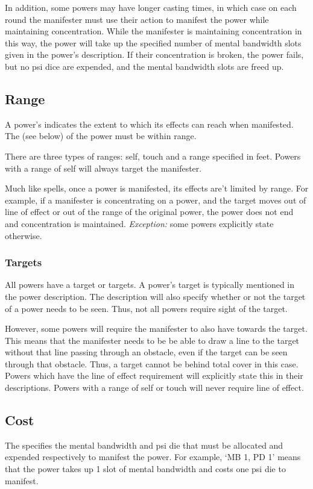 In addition, some powers may have longer casting times,
in which case on each round the manifester must use their action
to manifest the power while maintaining concentration.
While the manifester is maintaining concentration in this way,
the power will take up the specified number
of mental bandwidth slots given in the power's description.
If their concentration is broken, the power fails,
but no psi dice are expended,
and the mental bandwidth slots are freed up.

\subsection{Range}
A power's  indicates the extent
to which its effects can reach when manifested.
The  (see below) of the power must be within range.

There are three types of ranges: self, touch and a range
specified in feet.
Powers with a range of self will always target the manifester.

Much like spells,
once a power is manifested,
its effects are't limited by range.
For example,
if a manifester is concentrating on a power,
and the target moves out of line of effect or out of
the range of the original power,
the power does not end and concentration is maintained.
\textit{Exception:} some powers explicitly state otherwise.

\subsubsection{Targets}
All powers have a target or targets.
A power's target is typically mentioned in the power description.
The description will also specify whether or not the target
of a power needs to be seen.
Thus, not all powers require sight of the target.

However, some powers will
require the manifester to also have 
towards the target.
This means that the manifester needs to be be able to draw a line
to the target without that line passing through an obstacle,
even if the target can be seen through that obstacle.
Thus, a target cannot be behind total cover in this case.
Powers which have the line of effect requirement
will explicitly state this in their descriptions.
Powers with a range of self or touch
will never require line of effect.

\subsection{Cost}
The  specifies the mental bandwidth and psi die
that must be allocated and expended respectively to manifest the power.
For example,
`MB 1, PD 1'
means that the power takes up 1 slot of mental bandwidth
and costs one psi die to manifest.

